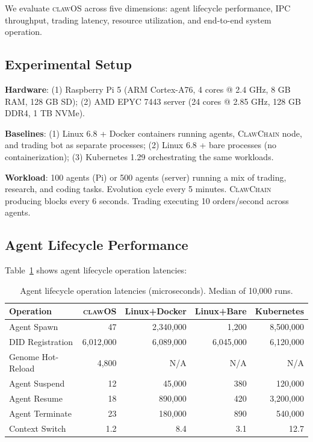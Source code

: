 \documentclass{article}
\newcommand{\clawos}{\textsc{clawOS}}
\newcommand{\clawchain}{\textsc{ClawChain}}
\begin{document}
We evaluate \clawos{} across five dimensions: agent lifecycle performance, IPC throughput, trading latency, resource utilization, and end-to-end system operation.

\subsection{Experimental Setup}

\textbf{Hardware}: (1) Raspberry Pi 5 (ARM Cortex-A76, 4 cores @ 2.4 GHz, 8 GB RAM, 128 GB SD); (2) AMD EPYC 7443 server (24 cores @ 2.85 GHz, 128 GB DDR4, 1 TB NVMe).

\textbf{Baselines}: (1) Linux 6.8 + Docker containers running agents, \clawchain{} node, and trading bot as separate processes; (2) Linux 6.8 + bare processes (no containerization); (3) Kubernetes 1.29 orchestrating the same workloads.

\textbf{Workload}: 100 agents (Pi) or 500 agents (server) running a mix of trading, research, and coding tasks. Evolution cycle every 5 minutes. \clawchain{} producing blocks every 6 seconds. Trading executing 10 orders/second across agents.

\subsection{Agent Lifecycle Performance}

Table~\ref{tab:lifecycle} shows agent lifecycle operation latencies:

\begin{table}[t]
\caption{Agent lifecycle operation latencies (microseconds). Median of 10,000 runs.}
\label{tab:lifecycle}
\centering
\small
\begin{tabular}{lrrrr}
\toprule
\textbf{Operation} & \textbf{\clawos{}} & \textbf{Linux+Docker} & \textbf{Linux+Bare} & \textbf{Kubernetes} \\
\midrule
Agent Spawn & 47 & 2,340,000 & 1,200 & 8,500,000 \\
DID Registration & 6,012,000 & 6,089,000 & 6,045,000 & 6,120,000 \\
Genome Hot-Reload & 4,800 & N/A & N/A & N/A \\
Agent Suspend & 12 & 45,000 & 380 & 120,000 \\
Agent Resume & 18 & 890,000 & 420 & 3,200,000 \\
Agent Terminate & 23 & 180,000 & 890 & 540,000 \\
Context Switch & 1.2 & 8.4 & 3.1 & 12.7 \\
\bottomrule
\end{tabular}
\end{table}
\end{document}

